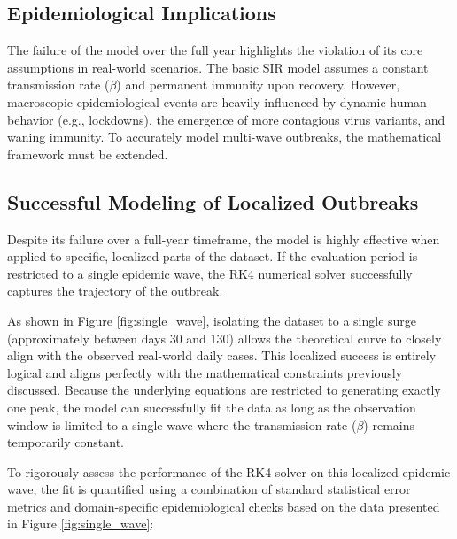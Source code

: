 \documentclass[12pt,a4paper]{article}
\begin{document}
\subsection{Epidemiological Implications}
The failure of the model over the full year highlights the violation of its core assumptions in real-world scenarios. The basic SIR model assumes a constant transmission rate ($\beta$) and permanent immunity upon recovery. However, macroscopic epidemiological events are heavily influenced by dynamic human behavior (e.g., lockdowns), the emergence of more contagious virus variants, and waning immunity. To accurately model multi-wave outbreaks, the mathematical framework must be extended. 

\subsection{Successful Modeling of Localized Outbreaks}
Despite its failure over a full-year timeframe, the model is highly effective when applied to specific, localized parts of the dataset. If the evaluation period is restricted to a single epidemic wave, the RK4 numerical solver successfully captures the trajectory of the outbreak. 

As shown in Figure \ref{fig:single_wave}, isolating the dataset to a single surge (approximately between days 30 and 130) allows the theoretical curve to closely align with the observed real-world daily cases. This localized success is entirely logical and aligns perfectly with the mathematical constraints previously discussed. Because the underlying equations are restricted to generating exactly one peak, the model can successfully fit the data as long as the observation window is limited to a single wave where the transmission rate ($\beta$) remains temporarily constant.

To rigorously assess the performance of the RK4 solver on this localized epidemic wave, the fit is quantified using a combination of standard statistical error metrics and domain-specific epidemiological checks based on the data presented in Figure \ref{fig:single_wave}:
\end{document}
